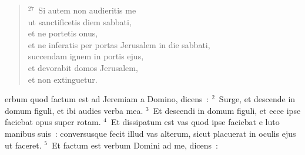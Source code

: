 \begin{flushleft}
\begin{verse}
${}^{27}$~Si autem non audieritis me\\ ut sanctificetis diem sabbati,\\ et ne portetis onus,\\ et ne inferatis per portas Jerusalem in die sabbati,\\ succendam ignem in portis ejus,\\ et devorabit domos Jerusalem,\\ et non extinguetur.\end{verse}\end{flushleft}



\bchapter
{}erbum quod factum est ad Jeremiam a Domino, dicens~:
${}^{2}$~Surge, et descende in domum figuli, et ibi audies verba mea.
${}^{3}$~Et descendi in domum figuli, et ecce ipse faciebat opus super rotam.
${}^{4}$~Et dissipatum est vas quod ipse faciebat e luto manibus suis~: conversusque fecit illud vas alterum, sicut placuerat in oculis ejus ut faceret.
${}^{5}$~Et factum est verbum Domini ad me, dicens~:
